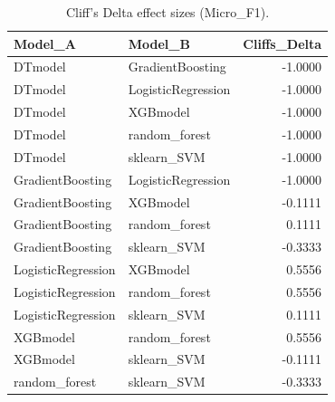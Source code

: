\begin{table}[t]
\centering
\begin{tabular}{llr}
\toprule
Model_A & Model_B & Cliffs_Delta \\
\midrule
DTmodel & GradientBoosting & -1.0000 \\
DTmodel & LogisticRegression & -1.0000 \\
DTmodel & XGBmodel & -1.0000 \\
DTmodel & random_forest & -1.0000 \\
DTmodel & sklearn_SVM & -1.0000 \\
GradientBoosting & LogisticRegression & -1.0000 \\
GradientBoosting & XGBmodel & -0.1111 \\
GradientBoosting & random_forest & 0.1111 \\
GradientBoosting & sklearn_SVM & -0.3333 \\
LogisticRegression & XGBmodel & 0.5556 \\
LogisticRegression & random_forest & 0.5556 \\
LogisticRegression & sklearn_SVM & 0.1111 \\
XGBmodel & random_forest & 0.5556 \\
XGBmodel & sklearn_SVM & -0.1111 \\
random_forest & sklearn_SVM & -0.3333 \\
\bottomrule
\end{tabular}
\caption{Cliff's Delta effect sizes (Micro_F1).}
\label{tab:cliffs_Micro_F1}
\end{table}